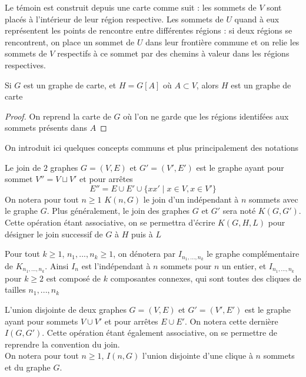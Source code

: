 \documentclass{scrartcl}
\begin{document}
\begin{flushleft}
Le témoin est construit depuis une carte comme suit : les sommets de $V$ sont placés à l'intérieur de leur région respective.
Les sommets de $U$ quand à eux représentent les points de rencontre entre différentes régions : si deux régions se rencontrent, on place
un sommet de $U$ dans leur frontière commune et on relie les sommets de $V$ respectifs à ce sommet par des chemins à valeur
dans les régions respectives.

\begin{prop}
    Si $G$ est un graphe de carte, et $H = G[A]$ où $A \subset V$, alors $H$ est un graphe de carte
\end{prop}

\begin{proof}
    On reprend la carte de $G$ où l'on ne garde que les régions identifées aux sommets présents dans $A$
\end{proof}

On introduit ici quelques concepts communs et plus principalement des notations

\begin{def*}[Join]
    Le join de $2$ graphes $G = (V, E)$ et $G' = (V', E')$ est le graphe ayant pour sommet $V'' = V \sqcup V'$ et pour arrêtes
    \[ E'' = E \cup E' \cup \{ xx' \mid x \in V, x \in V' \} \]
    On notera pour tout $n \geq 1$ $K(n, G)$ le join d'un indépendant à $n$ sommets avec le graphe $G$. Plus généralement,
    le join des graphes $G$ et $G'$ sera noté $K(G, G')$. Cette opération étant associative, on se permettra
    d'écrire $K(G, H, L)$ pour désigner le join successif de $G$ à $H$ puis à $L$
\end{def*}

\begin{def*}
    Pour tout $k \geq 1$, $n_1, ..., n_k \geq 1$, on dénotera par $I_{n_1, ..., n_k}$ le graphe complémentaire de $K_{n_1, ..., n_k}$.
    Ainsi $I_n$ est l'indépendant à $n$ sommets pour $n$ un entier, et $I_{n_1, ..., n_k}$ pour $k \geq 2$ est composé de $k$
    composantes connexes, qui sont toutes des cliques de tailles $n_1, ..., n_k$
\end{def*}

\begin{def*}
    L'union disjointe de deux graphes $G = (V, E)$ et $G' = (V', E')$ est le graphe ayant pour sommets $V \cup V'$ et pour arrêtes
    $E \cup E'$. On notera cette dernière $I(G, G')$. Cette opération étant également associative, on se permettre de reprendre la
    convention du join.\\
    On notera pour tout $n \geq 1$, $I(n, G)$ l'union disjointe d'une clique à $n$ sommets et du graphe $G$.
\end{def*}


\end{flushleft}
\end{document}
